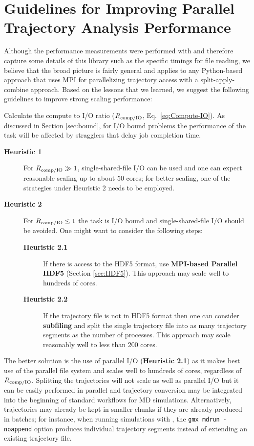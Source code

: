 
\section{Guidelines for Improving Parallel Trajectory Analysis Performance}
\label{sec:guidelines}

Although the performance measurements were performed with  and therefore capture some details of this library such as the specific timings for file reading, we believe that the broad picture is fairly general and applies to any Python-based approach that uses MPI for parallelizing trajectory access with a split-apply-combine approach.
Based on the lessons that we learned, we suggest the following guidelines to improve strong scaling performance:

Calculate the compute to I/O ratio ($R_{\text{comp/IO}}$, Eq.~\ref{eq:Compute-IO}). As discussed in Section \ref{sec:bound}, for I/O bound problems the performance of the task will be affected by stragglers that delay job completion time.
\begin{description}
\item[\textbf{Heuristic 1}] For $R_{\text{comp/IO}} \gg 1$, single-shared-file I/O can be used and one can expect reasonable scaling up to about 50 cores; for better scaling, one of the strategies under Heuristic 2 needs to be employed.
\item[\textbf{Heuristic 2}] For $R_{\text{comp/IO}} \le 1$ the task is I/O bound and single-shared-file I/O should be avoided.
  One might want to consider the following steps:  
  \begin{description}
  \item[\textbf{Heuristic 2.1}] If there is access to the HDF5 format, use \textbf{MPI-based Parallel HDF5} (Section \ref{sec:HDF5}). This approach may scale well to hundreds of cores.
  \item[\textbf{Heuristic 2.2}] If the trajectory file is not in HDF5 format then one can consider \textbf{subfiling} and split the single trajectory file into as many trajectory segments as the number of processes. This approach may scale reasonably well to less than 200 cores.
  \end{description}
\end{description}

The better solution is the use of parallel I/O (\textbf{Heuristic 2.1}) as it makes best use of the parallel file system and scales well to hundreds of cores, regardless of $R_{\text{comp/IO}}$. 
Splitting the trajectories will not scale as well as parallel I/O but it can be easily performed in parallel and trajectory conversion may be integrated into the beginning of standard workflows for MD simulations.  Alternatively, trajectories may already be kept in smaller chunks if they are already produced in batches; for instance, when running simulations with  \cite{Abraham:2015aa}, the \texttt{gmx mdrun -noappend} option produces individual trajectory segments instead of extending an existing trajectory file.
